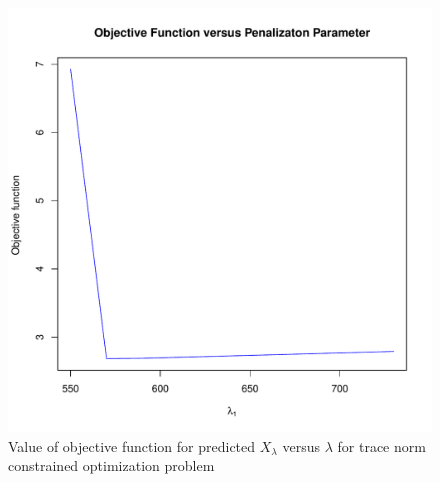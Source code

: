 \documentclass[12pt, leqno]{article}
\begin{document}
\begin{figure}
\begin{center}
                \includegraphics[scale = 0.5]{takehome3cv.pdf}
                \caption{Value of objective function for predicted $X_{\lambda}$ versus $\lambda$ for trace norm
                  constrained optimization problem}
                \label{fig:no3cv}
\end{center}
\end{figure}
\end{document}
